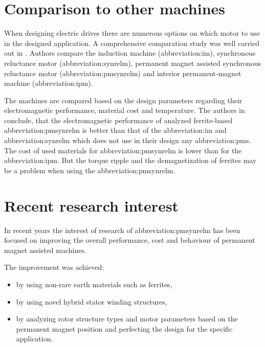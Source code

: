 \documentclass[a4paper, twoside, 11pt]{article}
\begin{document}
\section{Comparison to other machines}
    When designing electric drives there are numerous options on which motor to use in the designed application. A comprehensive comparation study was well carried out in \cite{zhang-Comprehensive-Comparative-Study-on-Permanent-Magnet-Assisted-Synchronous-Reluctance-Motors-and-Other-Types-of-Motor}. Authors compare the induction machine (\gls{abbreviation:im}), synchronous reluctance motor (\gls{abbreviation:synrelm}), permanent magnet assisted synchronous reluctance motor (\gls{abbreviation:pmsynrelm}) and interior permanent-magnet machine (\gls{abbreviation:ipm}).\par
    The machines are compared based on the design parameters regarding their electromagnetic performance, material cost and temperature. The authors in \cite{zhang-Comprehensive-Comparative-Study-on-Permanent-Magnet-Assisted-Synchronous-Reluctance-Motors-and-Other-Types-of-Motor} conclude, that the electromagnetic performance of analyzed ferrite-based \gls{abbreviation:pmsynrelm} is better than that of the \gls{abbreviation:im} and \gls{abbreviation:synrelm} which does not use in their design any \gls{abbreviation:pm}s. The cost of used materials for \gls{abbreviation:pmsynrelm} is lower than for the \gls{abbreviation:ipm}. But the torque ripple and the demagnetization of ferrites may be a problem when using the \gls{abbreviation:pmsynrelm}. \cite{zhang-Comprehensive-Comparative-Study-on-Permanent-Magnet-Assisted-Synchronous-Reluctance-Motors-and-Other-Types-of-Motor}
\section{Recent research interest}
    In recent years the interest of research of \gls{abbreviation:pmsynrelm} has been focused on improving the overall performance, cost and behaviour of permanent magnet assisted machines.\par
    The improvement was achieved:
        \begin{itemize}
        \item by using non-rare earth materials such as ferrites,
        \item by using novel hybrid stator winding structures,
        \item by analyzing rotor structure types and motor parameters based on the permanent magnet position and perfecting the design for the specific application.
        \end{itemize}
\end{document}
